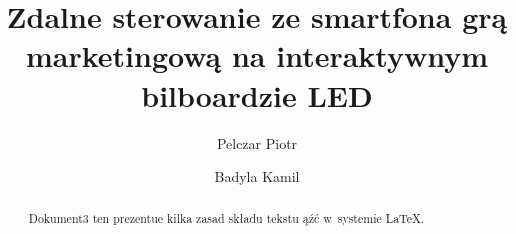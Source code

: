 \documentclass[11pt,a4paper]{article}
\title{Zdalne sterowanie ze smartfona grą marketingową na interaktywnym bilboardzie LED}
\author{
  Pelczar Piotr\\
  \and
  Badyla Kamil\\
}
\date{}
\begin{document}
\maketitle 

\begin{abstract} 
Dokument3 ten prezentue kilka zasad składu tekstu ąźć
w~systemie \LaTeX. 
\end{abstract} 

\tableofcontents
\listoftables







\listoffigures
\end{document}
